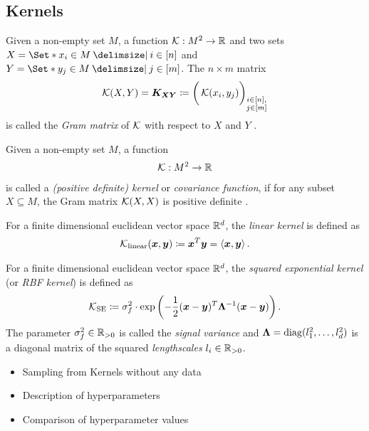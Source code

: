 \subsection{Kernels}
\begin{definition}
    Given a non-empty set $M$, a function $\operatorname{\mathcal{K}} : M^2 \to \mathbb{R}$ and two sets $X = \Set*{x_i \in M \with i \in [n]}$ and $Y = \Set*{y_j \in M \with j \in [m]}$.
    The $n \times m$ matrix
    \begin{align}
        \operatorname{\mathcal{K}}(X, Y) = \bm{K_{XY}} \coloneqq \bigg( \operatorname{\mathcal{K}}(x_i, y_j) \bigg)_{\substack{i \in [n], \\ j \in [m]}}
    \end{align}
    is called the \emph{Gram matrix} of $\operatorname{\mathcal{K}}$ with respect to $X$ and $Y$ \cite{scholkopf_learning_2002}.
\end{definition}
\begin{definition}[Kernel]
    Given a non-empty set $M$, a function
    \begin{align}
        \operatorname{\mathcal{K}} : M^2 \to \mathbb{R}
    \end{align}
    is called a \emph{(positive definite) kernel} or \emph{covariance function}, if for any subset $X \subseteq M$, the Gram matrix $\operatorname{\mathcal{K}}(X, X)$ is positive definite \cite{scholkopf_learning_2002}.
\end{definition}
\begin{definition}
    For a finite dimensional euclidean vector space $\mathbb{R}^d$, the \emph{linear kernel} is defined as
    \begin{align}
        \operatorname{\mathcal{K}}_{\text{linear}}(\bm{x}, \bm{y}) \coloneqq \bm{x}^T \bm{y} = \left\langle \bm{x}, \bm{y}\right\rangle.
    \end{align}
\end{definition}
\begin{definition}
    For a finite dimensional euclidean vector space $\mathbb{R}^d$, the \emph{squared exponential kernel} (or \emph{RBF kernel}) is defined as
    \begin{align}
        \operatorname{\mathcal{K}}_{\text{SE}} \coloneqq \sigma_f^2 \cdot \exp \left( -\frac{1}{2} (\bm{x} - \bm{y})^T \bm{\Lambda}^{-1} (\bm{x} - \bm{y}) \right).
    \end{align}
    The parameter $\sigma_f^2 \in \mathbb{R}_{>0}$ is called the \emph{signal variance} and $\bm{\Lambda} = \operatorname{diag}(l_1^2, \dots, l_d^2)$ is a diagonal matrix of the squared \emph{lengthscales} $l_i \in \mathbb{R}_{>0}$.
\end{definition}
\begin{itemize}
    \item Sampling from Kernels without any data
    \item Description of hyperparameters
    \item Comparison of hyperparameter values
\end{itemize}

